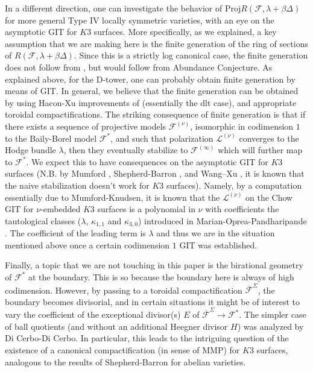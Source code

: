 \documentclass[11pt]{amsart}
\numberwithin{equation}{subsection}
\theoremstyle{plain}
\theoremstyle{remark}
\theoremstyle{definition}
\newcommand{\sF}{\mathscr{F}}
\newcommand{\calF}{\mathcal{F}}
\newcommand{\calL}{\mathcal{L}}
\newcommand{\Proj}{\mathrm{Proj}}
\newcommand{\cF}{{\mathscr F}}
\begin{document}
In a different direction, one can investigate the behavior of $\Proj R(\cF, \lambda+\beta\Delta)$ for more general Type IV locally symmetric varieties, with an eye on the asymptotic GIT for $K3$ surfaces. More specifically, as we explained, a key assumption that we are making here is the finite generation of the ring of sections of $R(\calF, \lambda+\beta \Delta)$. Since this is a strictly log canonical case, the finite generation does not follow from \cite{bchmk}, but would follow from Abundance Conjecture. As explained above, for the D-tower, one can probably obtain finite generation by means of GIT. In general, we believe that the finite generation can be obtained by using Hacon-Xu \cite{haconxu} improvements of \cite{bchmk} (essentially the dlt case), and appropriate toroidal compactifications. The striking consequence of finite generation is that if there exists a sequence of projective models $\sF^{(\nu)}$, isomorphic in codimension $1$ to the Baily-Borel model $\sF^*$,  and such that polarization $\calL^{(\nu)}$ converges to the Hodge bundle $\lambda$, then they eventually stabilize to $\sF^{(\infty)}$  which will further map to $\sF^*$. We expect this to have consequences on the asymptotic GIT for $K3$ surfaces (N.B. by Mumford \cite{mumford_stab}, Shepherd-Barron \cite{sbnef}, and Wang--Xu \cite{wangxu}, it is known that the naive stabilization doesn't work for $K3$ surfaces). Namely, by a computation essentially due to Mumford-Knudsen, it is known that the $\calL^{(\nu)}$  on the Chow GIT for $\nu$-embedded $K3$ surfaces is a polynomial in $\nu$ with coefficients the tautological classes ($\lambda$, $\kappa_{1,1}$ and $\kappa_{3,0}$) introduced in Marian-Oprea-Pandharipande \cite{mop}. The coefficient of the leading term is $\lambda$ and thus we are in the situation mentioned above once a certain codimension $1$ GIT was established.  

\medskip

Finally, a topic that we are not touching in this paper is the birational geometry of $\sF^*$ at the boundary. This is so because the boundary here is always of high codimension. However, by passing to a toroidal compactification $\overline{\sF}^\Sigma$, the boundary becomes divisorial, and in certain situations it might be of interest to vary the coefficient of the exceptional divisor(s) $E$ of $\overline{\sF}^\Sigma\to \sF^*$. The simpler case of ball quotients (and without an additional Heegner divisor $H$) was analyzed by Di Cerbo-Di Cerbo. In particular, this leads to the intriguing question of the existence of a canonical compactification (in sense of MMP) for $K3$ surfaces, analogous to the results of Shepherd-Barron for abelian varieties. 
\end{document}
